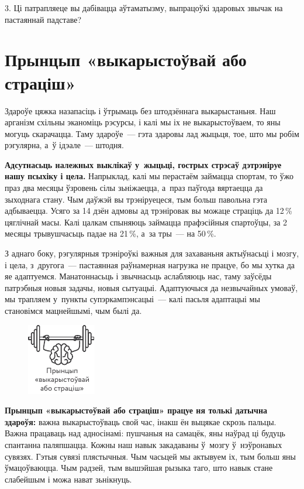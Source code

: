 3. Ці патрапляеце вы дабівацца аўтаматызму, выпрацоўкі здаровых звычак на пастаяннай падставе?


\section{Прынцып «выкарыстоўвай або страціш»}

Здароўе цяжка назапасіць і ўтрымаць без штодзённага выкарыстаньня. Наш арганізм схільны эканоміць рэсурсы, і калі мы іх не выкарыстоўваем, то яны могуць скарачацца. Таму здароўе~--- гэта здаровы лад жыцьця, тое, што мы робім рэгулярна, а~ў ідэале~--- штодня.

\textbf{Адсутнасьць належных выклікаў у~жыцьці, гострых стрэсаў дэтрэніруе нашу псыхіку і цела.} Напрыклад, калі мы перастаём займацца спортам, то ўжо праз два месяцы ўзровень сілы зьніжаецца, а~праз паўгода вяртаецца да зыходнага стану. Чым даўжэй вы трэніруецеся, тым больш павольна гэта адбываецца. Усяго за 14 дзён адмовы ад трэніровак вы можаце страціць да 12\,\% цяглічнай масы. Калі цалкам спыняюць займацца прафэсійныя спартоўцы, за 2 месяцы трывушчасьць падае на 21\,\%, а~за тры~--- на 50\,\%.

З аднаго боку, рэгулярныя трэніроўкі важныя для захаваньня актыўнасьці і мозгу, і цела, з~другога~--- пастаянная раўнамерная нагрузка не працуе, бо мы хутка да яе адаптуемся. Манатоннасьць і звычнасьць аслабляюць нас, таму заўсёды патрэбныя новыя задачы, новыя сытуацыі. Адаптуючыся да незвычайных умоваў, мы трапляем у~пункты супэркампэнсацыі~--- калі пасьля адаптацыі мы становімся мацнейшымі, чым былі да.

\begin{figure}[htb!]
  \centering
  \includegraphics[scale=1.5]{willpower/ch3/14.pdf}
\end{figure}

\textbf{Прынцып «выкарыстоўвай або страціш» працуе ня толькі датычна здароўя:} важна выкарыстоўваць свой час, інакш ён выцякае скрозь пальцы. Важна працаваць над адносінамі: пушчаныя на самацёк, яны наўрад ці будуць спантанна паляпшацца. Кожны наш навык закадаваны ў~мозгу ў~нэўронавых сувязях. Гэтыя сувязі плястычныя. Чым часьцей мы актывуем іх, тым больш яны ўмацоўваюцца. Чым радзей, тым вышэйшая рызыка таго, што навык стане слабейшым і можа нават зьнікнуць.

